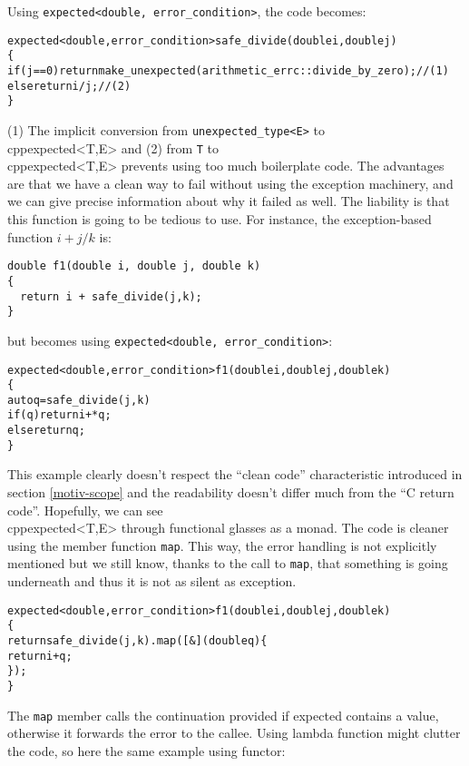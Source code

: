 \documentclass[a4paper,10pt]{article}
\newcommand{\cpp}[1]{\lstinline{#1}}
\begin{document}
\noindent
Using \cpp{expected<double, error_condition>}, the code becomes:

\begin{alltt}
expected<double,error_condition> safe_divide(double i, double j)
\{
  if (j==0) return make_unexpected(arithmetic_errc::divide_by_zero); // (1)
  else return i / j; // (2)
\}
\end{alltt}

(1) The implicit conversion from \cpp{unexpected_type<E>} to \\cpp{expected<T,E>} and (2) from \cpp{T} to \\cpp{expected<T,E>} prevents using too much boilerplate code. The advantages are that we have a clean way to fail without using the exception machinery, and we can give precise information about why it failed as well. The liability is that this function is going to be tedious to use. For instance, the exception-based function $i + j/k$ is:

\begin{lstlisting}
double f1(double i, double j, double k)
{
  return i + safe_divide(j,k);
}
\end{lstlisting}

\noindent
but becomes using \cpp{expected<double, error_condition>}:

\begin{alltt}
expected<double, error_condition> f1(double i, double j, double k)
\{
  auto q = safe_divide(j, k)
  if(q) return i + *q;
  else return q;
\}
\end{alltt}

\noindent
This example clearly doesn't respect the ``clean code'' characteristic introduced in section \ref{motiv-scope} and the readability doesn't differ much from the ``C return code''. Hopefully, we can see \\cpp{expected<T,E>} through functional glasses as a monad. The code is cleaner using the member function \cpp{map}. This way, the error handling is not explicitly mentioned but we still know, thanks to the call to \cpp{map}, that something is going underneath and thus it is not as silent as exception.

\begin{alltt}
expected<double, error_condition> f1(double i, double j, double k)
\{
  return safe_divide(j, k).map([&](double q)\{
    return i + q;
  \});
\}
\end{alltt}

The \cpp{map} member calls the continuation provided if expected contains a value, otherwise it forwards the error to the callee. Using lambda function might clutter the code, so here the same example using functor:
\end{document}
